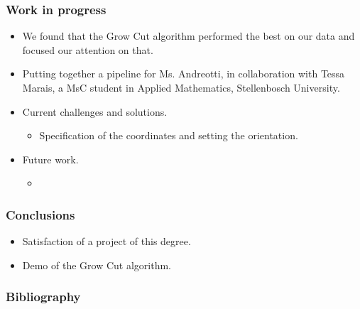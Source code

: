 \documentclass{beamer}
\begin{document}
\begin{frame}
\frametitle{Work in progress} 
\begin{itemize}
\item We found that the Grow Cut algorithm performed the best on our data and focused our attention on that.
\item Putting together a pipeline for Ms. Andreotti, in collaboration with Tessa Marais, a MsC student in Applied Mathematics, Stellenbosch University.
\item Current challenges and solutions.
\begin{itemize}
\item Specification of the coordinates and setting the orientation.
\end{itemize}
\item Future work.
\begin{itemize}
\item
\end{itemize}
\end{itemize}
\end{frame}


\begin{frame}
\frametitle{Conclusions}
\begin{itemize}
\item Satisfaction of a project of this degree.
\item Demo of the Grow Cut algorithm.
\end{itemize}
\end{frame}


\begin{frame}
\frametitle{Bibliography}


\end{frame}
\end{document}
